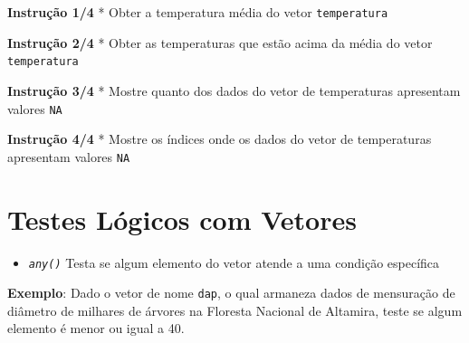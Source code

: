 \documentclass[
]{article}
\newenvironment{Shaded}{\begin{snugshade}}{\end{snugshade}}
\providecommand{\tightlist}{%
  \setlength{\itemsep}{0pt}\setlength{\parskip}{0pt}}
\begin{document}
\textbf{Instrução 1/4} * Obter a temperatura média do vetor
\texttt{temperatura}

\begin{Shaded}
\begin{Highlighting}[]

\end{Highlighting}
\end{Shaded}

\textbf{Instrução 2/4} * Obter as temperaturas que estão acima da média
do vetor \texttt{temperatura}

\begin{Shaded}
\begin{Highlighting}[]

\end{Highlighting}
\end{Shaded}

\textbf{Instrução 3/4} * Mostre quanto dos dados do vetor de
temperaturas apresentam valores \texttt{NA}

\begin{Shaded}
\begin{Highlighting}[]

\end{Highlighting}
\end{Shaded}

\textbf{Instrução 4/4} * Mostre os índices onde os dados do vetor de
temperaturas apresentam valores \texttt{NA}

\begin{Shaded}
\begin{Highlighting}[]

\end{Highlighting}
\end{Shaded}

\hypertarget{testes-luxf3gicos-com-vetores}{%
\section{Testes Lógicos com
Vetores}\label{testes-luxf3gicos-com-vetores}}

\begin{itemize}
\tightlist
\item
  \emph{\texttt{any()}} Testa se algum elemento do vetor atende a uma
  condição específica
\end{itemize}

\textbf{Exemplo}: Dado o vetor de nome \texttt{dap}, o qual armaneza
dados de mensuração de diâmetro de milhares de árvores na Floresta
Nacional de Altamira, teste se algum elemento é menor ou igual a 40.
\end{document}
